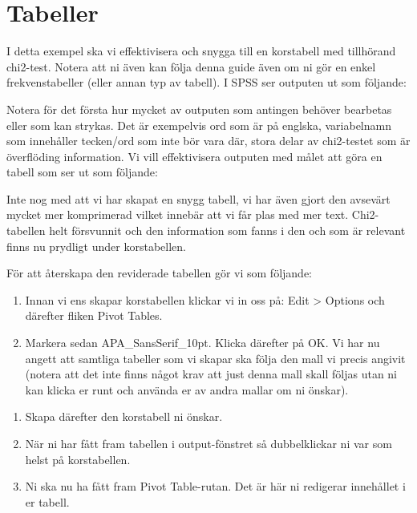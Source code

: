 \documentclass[
]{book}
\begin{document}
\hypertarget{tabeller}{%
\section{Tabeller}\label{tabeller}}

I detta exempel ska vi effektivisera och snygga till en korstabell med tillhörand chi2-test. Notera att ni även kan följa denna guide även om ni gör en enkel frekvenstabeller (eller annan typ av tabell). I SPSS ser outputen ut som följande:

Notera för det första hur mycket av outputen som antingen behöver bearbetas eller som kan strykas. Det är exempelvis ord som är på englska, variabelnamn som innehåller tecken/ord som inte bör vara där, stora delar av chi2-testet som är överflöding information. Vi vill effektivisera outputen med målet att göra en tabell som ser ut som följande:

Inte nog med att vi har skapat en snygg tabell, vi har även gjort den avsevärt mycket mer komprimerad vilket innebär att vi får plas med mer text. Chi2-tabellen helt försvunnit och den information som fanns i den och som är relevant finns nu prydligt under korstabellen.

För att återskapa den reviderade tabellen gör vi som följande:

\begin{enumerate}
\def\labelenumi{\arabic{enumi}.}
\item
  Innan vi ens skapar korstabellen klickar vi in oss på: Edit \textgreater{} Options och därefter fliken Pivot Tables.
\item
  Markera sedan APA\_SansSerif\_10pt. Klicka därefter på OK. Vi har nu angett att samtliga tabeller som vi skapar ska följa den mall vi precis angivit (notera att det inte finns något krav att just denna mall skall följas utan ni kan klicka er runt och använda er av andra mallar om ni önskar).
\end{enumerate}

\begin{enumerate}
\def\labelenumi{\arabic{enumi}.}
\setcounter{enumi}{2}
\item
  Skapa därefter den korstabell ni önskar.
\item
  När ni har fått fram tabellen i output-fönstret så dubbelklickar ni var som helst på korstabellen.
\item
  Ni ska nu ha fått fram Pivot Table-rutan. Det är här ni redigerar innehållet i er tabell.
\end{enumerate}
\end{document}
